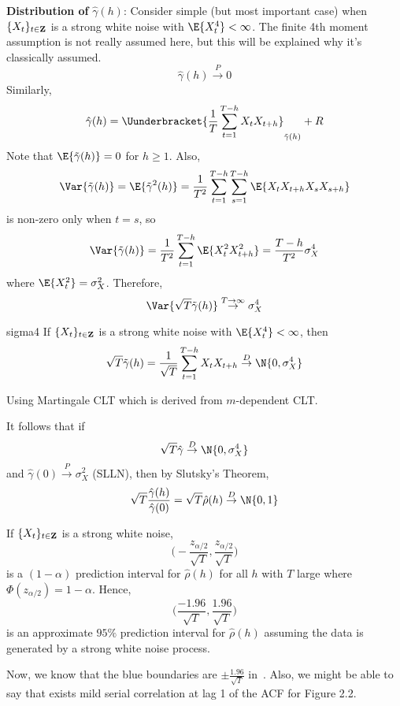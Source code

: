 \textbf{Distribution of} $ \hat{\gamma}(h) $: Consider
simple (but most important case) when $ \{X_t\}_{t\in\mathbf{Z}} $
is a strong white noise with $ \E{X_t^4}<\infty $. The finite
4th moment assumption is not really assumed here, but this will
be explained why it's classically assumed.
\[ \hat{\gamma}(h)\stackrel{P}{\to}0 \]
Similarly,
\[ \hat{\gamma}(h)=\Uunderbracket{\frac{1}{T}\sum_{t=1}^{T-h}X_t X_{t+h}}_{\tilde{\gamma}(h)}+R   \]
Note that $ \E{\tilde{\gamma}(h)}=0 $ for $ h\ge 1 $. Also,
\[ \Var{\tilde{\gamma}(h)}=\E{\tilde{\gamma}^2(h)}=
    \frac{1}{T^2}\sum_{t=1}^{T-h} \sum_{s=1}^{T-h}
    \E{X_t X_{t+h}X_s X_{s+h}} \]
is non-zero only when $ t=s $, so
\[ \Var{\tilde{\gamma}(h)}=\frac{1}{T^2} \sum_{t=1}^{T-h} \E{X_t^2 X_{t+h}^2}=
    \frac{T-h}{T^2} \sigma_X^4 \]
where $ \E{X_t^2}=\sigma_X^2 $. Therefore,
\[ \Var{\sqrt{T}\tilde{\gamma}(h)}
    \stackrel{T\to\infty}{\to}\sigma_X^4 \]
\begin{Theorem}{}{sigma4}
    If $ \{X_t\}_{t\in\mathbf{Z}} $ is a strong white noise
    with $ \E{X_t^4}<\infty $, then
    \[ \sqrt{T}\tilde{\gamma}(h)=\frac{1}{\sqrt{T}} \sum_{t=1}^{T-h} X_t X_{t+h}
        \stackrel{D}{\to}\N{0,\sigma_X^4} \]
\end{Theorem}
\begin{Proof}{}{}
    Using Martingale CLT which is derived from $ m $-dependent CLT.\@
\end{Proof}
\begin{Corollary}{}{}
    It follows that if
    \[ \sqrt{T}\hat{\gamma}\stackrel{D}{\to}\N{0,\sigma_X^4} \]
    and $ \hat{\gamma}(0)\stackrel{P}{\to}\sigma_X^2 $ (SLLN), then by Slutsky's Theorem,
    \[ \sqrt{T}\frac{\hat{\gamma}(h)}{\hat{\gamma}(0)}=
        \sqrt{T}\hat{\rho}(h)\stackrel{D}{\to}\N{0,1}  \]
\end{Corollary}
If $ \{X_t\}_{t\in\mathbf{Z}} $ is a strong white noise,
\[ \biggl(-\frac{z_{\alpha/2}}{\sqrt{T}} ,\frac{z_{\alpha/2}}{\sqrt{T}} \biggr) \]
is a $ (1-\alpha) $ prediction interval for $ \hat{\rho}(h) $
for all $ h $ with $ T $ large where $ \Phi(z_{\alpha/2})=1-\alpha $. Hence,
\[ \biggl(\frac{-1.96}{\sqrt{T}},\frac{1.96}{\sqrt{T}} \biggr) \]
is an approximate $ 95\% $ prediction interval for $ \hat{\rho}(h) $
assuming the data is generated by a strong white noise process.

Now, we know that the blue boundaries are $ \displaystyle \pm \frac{1.96}{\sqrt{T}} $
in~. Also, we might be able to say that
exists mild serial correlation at lag 1 of the ACF for Figure 2.2.
